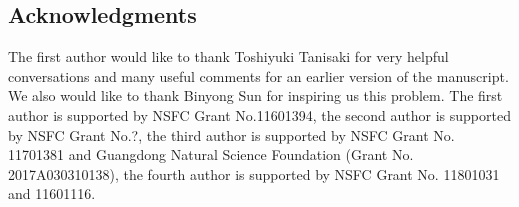 \documentclass{amsart}[12pt]
\numberwithin{equation}{section}
\begin{document}
%
%
%
%
%
%
%

\subsection*{Acknowledgments}
The first author would like to thank Toshiyuki Tanisaki for very helpful conversations and many useful comments for an earlier version of the manuscript. We also would like to thank Binyong Sun for inspiring us this problem.
The first author is supported by NSFC Grant No.11601394, the second author is supported by NSFC Grant No.?,   the third author is supported by NSFC Grant No. 11701381 and Guangdong Natural Science Foundation (Grant No. 2017A030310138), the fourth author is supported by
NSFC Grant No. 11801031 and 11601116.
\end{document}
